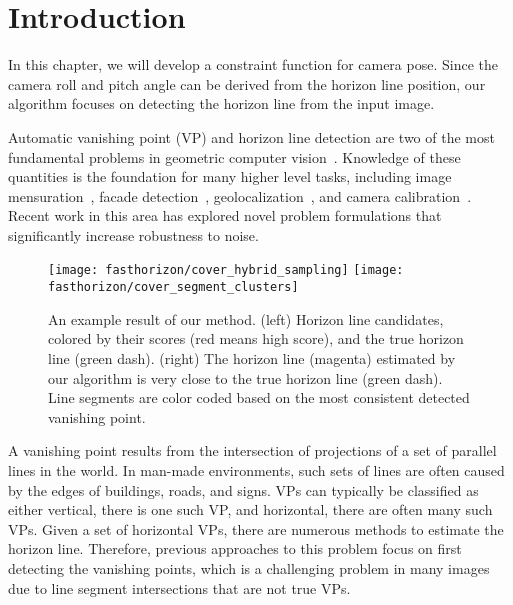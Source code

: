 \section{Introduction}

In this chapter, we will develop a constraint function for
camera pose. Since the camera roll and pitch angle can be derived from
the horizon line position, our algorithm focuses on detecting the
horizon line from the input image.

Automatic vanishing point (VP) and horizon line detection are two of
the most fundamental problems in geometric computer
vision~\cite{barnard1983interpreting,magee1984determining}. Knowledge
of these quantities is the foundation for many higher level
tasks, including image mensuration~\cite{criminisi2000single},
facade detection~\cite{liulocal2014},
geolocalization~\cite{baatz2010handling,workman2014rainbow}, and
camera
calibration~\cite{autorecovery2000,grammatikopoulos2007automatic,
jacobs13cloudcalibration,videocampass2002}. Recent work in this area
\cite{global2013,wildenauer2012,kitware2013} has explored novel
problem formulations that significantly increase robustness to noise.

\begin{figure}
  \centering
  \texttt{[image: fasthorizon/cover\_hybrid\_sampling]}
  \hfill
  \texttt{[image: fasthorizon/cover\_segment\_clusters]}

  \caption{An example result of our method. (left) Horizon line
    candidates, colored by their scores (red means high score), and
    the true horizon line (green dash). (right) The horizon line
    (magenta) estimated by our algorithm is very close to the true
    horizon line (green dash).  Line segments are color coded based on
    the most consistent detected vanishing point.}

  \label{fig:cover}
\end{figure}

A vanishing point results from the intersection of projections of a
set of parallel lines in the world. In man-made environments, such
sets of lines are often caused by the edges of buildings, roads, and
signs. VPs can typically be classified as either vertical, there is
one such VP, and horizontal, there are often many such VPs.  Given a
set of horizontal VPs, there are numerous methods to estimate the
horizon line.  Therefore, previous approaches to this problem focus on
first detecting the vanishing points, which is a challenging problem
in many images due to line segment intersections that are not true
VPs.

